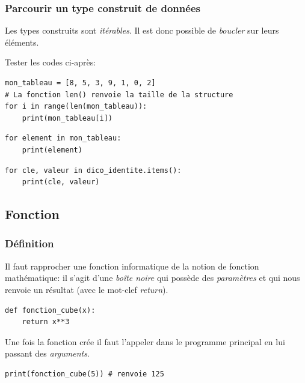 \documentclass[a4paper,11pt]{article}
\begin{document}
\begin{Form}
\subsubsection{Parcourir un type construit de données}
Les types construits sont \emph{itérables}. Il est donc possible de \emph{boucler} sur leurs éléments.
\begin{activite}
Tester les codes ci-après:
\begin{center}
\begin{lstlisting}
mon_tableau = [8, 5, 3, 9, 1, 0, 2]
# La fonction len() renvoie la taille de la structure
for i in range(len(mon_tableau)):
	print(mon_tableau[i])
\end{lstlisting}
\label{moncode}
\end{center}
\begin{center}
\begin{lstlisting}
for element in mon_tableau:
	print(element)
\end{lstlisting}
\label{moncode}
\end{center}
\begin{center}
\begin{lstlisting}
for cle, valeur in dico_identite.items():
	print(cle, valeur)
\end{lstlisting}
\label{moncode}
\end{center}
\end{activite}
\subsection{Fonction}
\subsubsection{Définition}
Il faut rapprocher une fonction informatique de la notion de fonction mathématique: il s'agit d'une \emph{boîte noire} qui possède des \emph{paramètres} et qui nous renvoie un résultat (avec le mot-clef \emph{return}).
\begin{code}[!h]
\begin{lstlisting}
def fonction_cube(x):
	return x**3
\end{lstlisting}
\label{moncode}
\end{code}

Une fois la fonction crée il faut l'appeler dans le programme principal en lui passant des \emph{arguments}.
\begin{code}[!h]
\begin{lstlisting}
print(fonction_cube(5)) # renvoie 125
\end{lstlisting}
\label{moncode}
\end{code}


\end{Form}
\end{document}

